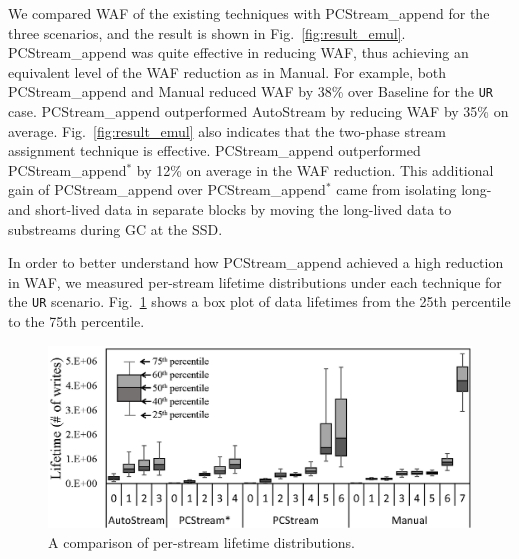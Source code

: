 We compared WAF of the existing techniques with \textsf{\small PCStream\_append} for the three
scenarios, and the result is shown in Fig.~\ref{fig:result_emul}.
\textsf{\small PCStream\_append} was quite effective in reducing WAF, 
thus achieving an equivalent level of the WAF reduction as in \textsf{\small Manual}.  
For example, both \textsf{\small PCStream\_append} and \textsf{\small Manual} reduced WAF by 38\% over \textsf{\small Baseline} for the \texttt{UR} case. 
\textsf{\small PCStream\_append} outperformed \textsf{\small AutoStream} by reducing WAF by 35\% on average.
Fig.~\ref{fig:result_emul} also indicates that the two-phase stream assignment technique is effective.  
\textsf{\small PCStream\_append} outperformed \textsf{\small PCStream\_append$^{*}$} by 12\% on average in the WAF reduction.
This additional gain of \textsf{\small PCStream\_append} over \textsf{\small PCStream\_append$^{*}$} came from isolating long- and short-lived data in separate blocks 
by moving the long-lived data to substreams during GC at the SSD.


In order to better understand how \textsf{\small PCStream\_append} achieved a high reduction in WAF, 
we measured per-stream lifetime distributions under each technique for the \texttt{UR} scenario.
Fig.~\ref{fig:stream_lifetime} shows a box plot of data lifetimes from the 25th percentile to the 75th percentile.

\begin{figure}[t]
	\centering
	\includegraphics[scale=0.6]{figure/pcstream_/stream_lifetime}
	\caption{A comparison of per-stream lifetime distributions.}
	\label{fig:stream_lifetime}
\end{figure}



